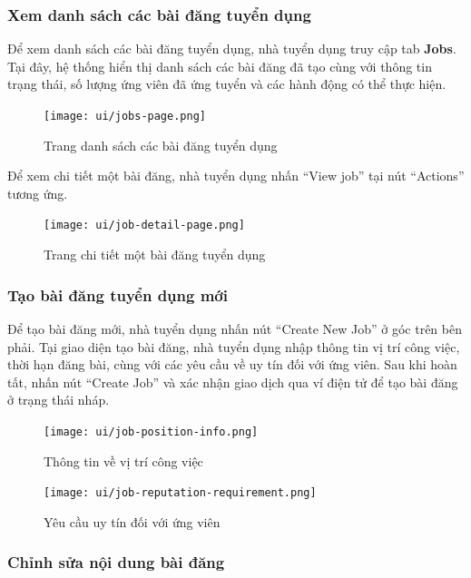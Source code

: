 \subsubsection{Xem danh sách các bài đăng tuyển dụng}

Để xem danh sách các bài đăng tuyển dụng, nhà tuyển dụng truy cập tab \textbf{Jobs}.  
Tại đây, hệ thống hiển thị danh sách các bài đăng đã tạo cùng với thông tin trạng thái, số lượng ứng viên đã ứng tuyển và các hành động có thể thực hiện.

\begin{figure}[H]
  \centering
  \texttt{[image: ui/jobs-page.png]}
  \caption{Trang danh sách các bài đăng tuyển dụng}
  \label{fig:jobs-page}
\end{figure}

Để xem chi tiết một bài đăng, nhà tuyển dụng nhấn ``View job'' tại nút ``Actions'' tương ứng.

\begin{figure}[H]
  \centering
  \texttt{[image: ui/job-detail-page.png]}
  \caption{Trang chi tiết một bài đăng tuyển dụng}
  \label{fig:job-detail-page}
\end{figure}

\subsubsection{Tạo bài đăng tuyển dụng mới}

Để tạo bài đăng mới, nhà tuyển dụng nhấn nút ``Create New Job'' ở góc trên bên phải.  
Tại giao diện tạo bài đăng, nhà tuyển dụng nhập thông tin vị trí công việc, thời hạn đăng bài, cùng với các yêu cầu về uy tín đối với ứng viên.  
Sau khi hoàn tất, nhấn nút ``Create Job'' và xác nhận giao dịch qua ví điện tử để tạo bài đăng ở trạng thái nháp.

\begin{figure}[H]
  \centering
  \texttt{[image: ui/job-position-info.png]}
  \caption{Thông tin về vị trí công việc}
  \label{fig:job-position-info}
\end{figure}

\begin{figure}[H]
  \centering
  \texttt{[image: ui/job-reputation-requirement.png]}
  \caption{Yêu cầu uy tín đối với ứng viên}
  \label{fig:job-reputation-requirement}
\end{figure}

\subsubsection{Chỉnh sửa nội dung bài đăng}

